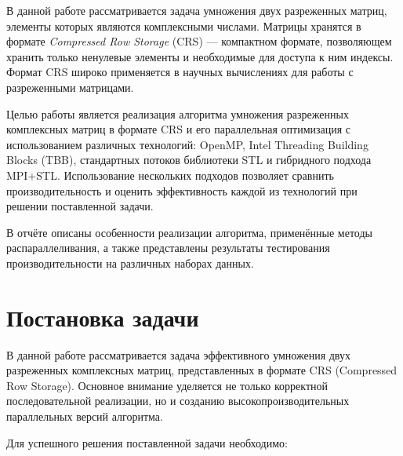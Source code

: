 \documentclass[a4paper,12pt]{article}
\begin{document}
В данной работе рассматривается задача умножения двух разреженных матриц, элементы которых являются комплексными числами. Матрицы хранятся в формате \textit{Compressed Row Storage} (CRS) — компактном формате, позволяющем хранить только ненулевые элементы и необходимые для доступа к ним индексы.  
Формат CRS широко применяется в научных вычислениях для работы с разреженными матрицами.

Целью работы является реализация алгоритма умножения разреженных комплексных матриц в формате CRS и его параллельная оптимизация с использованием различных технологий: OpenMP, Intel Threading Building Blocks (TBB), стандартных потоков библиотеки STL и гибридного подхода MPI+STL. 
Использование нескольких подходов позволяет сравнить производительность и оценить эффективность каждой из технологий при решении поставленной задачи.

В отчёте описаны особенности реализации алгоритма, применённые методы распараллеливания, а также представлены результаты тестирования производительности на различных наборах данных.

\newpage

\section{Постановка задачи}

В данной работе рассматривается задача эффективного умножения двух разреженных  
комплексных матриц, представленных в формате CRS (Compressed Row Storage).  
Основное внимание уделяется не только корректной последовательной реализации,  
но и созданию высокопроизводительных параллельных версий алгоритма.

\vspace{0.3cm}

Для успешного решения поставленной задачи необходимо:
\end{document}
